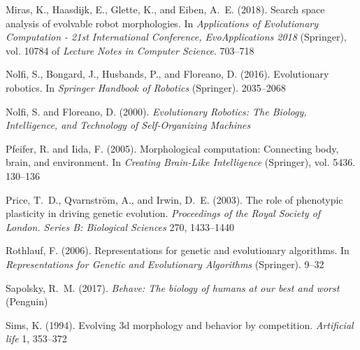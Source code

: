 \documentclass[utf8]{frontiersSCNS} %
\begin{document}
\begin{thebibliography}{29}
Miras, K., Haasdijk, E., Glette, K., and Eiben, A.~E. (2018{}).
\newblock Search space analysis of evolvable robot morphologies.
\newblock In \emph{Applications of Evolutionary Computation - 21st
  International Conference, EvoApplications 2018} (Springer), vol. 10784 of
  \emph{Lecture Notes in Computer Science}. 703--718

Nolfi, S., Bongard, J., Husbands, P., and Floreano, D. (2016).
\newblock Evolutionary robotics.
\newblock In \emph{Springer Handbook of Robotics} (Springer). 2035--2068

Nolfi, S. and Floreano, D. (2000).
\newblock \emph{Evolutionary Robotics: The Biology, Intelligence, and
  Technology of Self-Organizing Machines}

Pfeifer, R. and Iida, F. (2005).
\newblock Morphological computation: Connecting body, brain, and environment.
\newblock In \emph{Creating Brain-Like Intelligence} (Springer), vol. 5436.
  130--136

Price, T.~D., Qvarnstr{\"o}m, A., and Irwin, D.~E. (2003).
\newblock The role of phenotypic plasticity in driving genetic evolution.
\newblock \emph{Proceedings of the Royal Society of London. Series B:
  Biological Sciences} 270, 1433--1440

Rothlauf, F. (2006).
\newblock Representations for genetic and evolutionary algorithms.
\newblock In \emph{Representations for Genetic and Evolutionary Algorithms}
  (Springer). 9--32

Sapolsky, R.~M. (2017).
\newblock \emph{Behave: The biology of humans at our best and worst} (Penguin)

Sims, K. (1994).
\newblock Evolving 3d morphology and behavior by competition.
\newblock \emph{Artificial life} 1, 353--372

\end{thebibliography}
\end{document}
